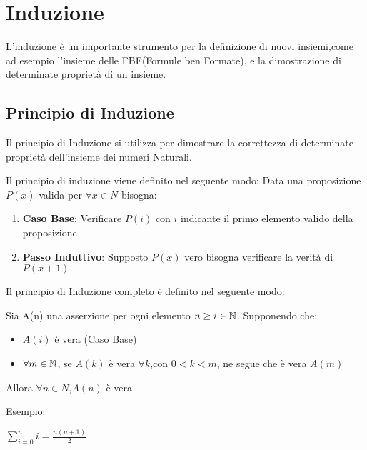 \chapter{Induzione}
L'induzione è un importante strumento per la definizione di nuovi insiemi,come
ad esempio l'insieme delle FBF(Formule ben Formate), e la dimostrazione di determinate
proprietà di un insieme.

\section{Principio di Induzione}
Il principio di Induzione si utilizza per dimostrare la correttezza di determinate
proprietà dell'insieme dei numeri Naturali.

Il principio di induzione viene definito nel seguente modo:\newline
Data una proposizione $P(x)$ valida per $\forall x \in N$ bisogna:
\begin{enumerate}
  \item \textbf{Caso Base}: Verificare $P(i)$ con $i$ indicante il primo elemento valido della proposizione
  \item \textbf{Passo Induttivo}: Supposto $P(x)$ vero  bisogna verificare la verità di $P(x+1)$
\end{enumerate}

Il principio di Induzione completo è definito nel seguente modo:
\begin{defi}
Sia A(n) una asserzione per ogni elemento $n \geq i \in \mathbb{N}$. Supponendo che:
\begin{itemize}
    \item $A(i)$ è vera (Caso Base)
    \item $\forall m \in \mathbb{N}$, se $A(k)$ è vera $\forall k$,con $0 < k < m$, ne segue
          che è vera $A(m)$
\end{itemize}
Allora $\forall n \in N$,$A(n)$ è vera
\end{defi}

Esempio:\newline
\begin{thm}$\displaystyle \sum_{i = 0} ^ n i = \frac{n(n + 1)}{2}$ \end{thm}

